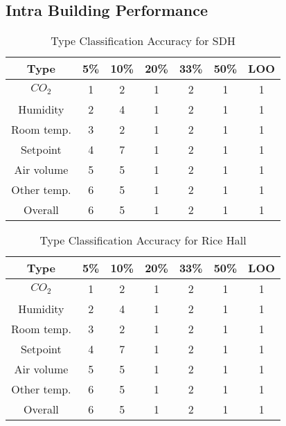 \subsection{Intra Building Performance}
\begin{table}[ht!]
\caption{Type Classification Accuracy for SDH}
\centering %
\begin{tabular}{c | c | c | c | c | c | c}%
\hline %
Type & 5\% & 10\% & 20\% & 33\% & 50\% & LOO \\ %
\hline\hline %
$CO_{2}$ & 1 & 2 & 1 & 2 & 1 & 1 \\ %
\hline %
Humidity & 2 & 4 & 1 & 2 & 1 & 1 \\
\hline %
Room temp. & 3 & 2 & 1 & 2 & 1 & 1 \\
\hline %
Setpoint & 4 & 7 & 1 & 2 & 1 & 1 \\
\hline %
Air volume & 5 & 5 & 1 & 2 & 1 & 1 \\ %
\hline %
Other temp. & 6 & 5 & 1 & 2 & 1 & 1 \\ %
\hline %
Overall & 6 & 5 & 1 & 2 & 1 & 1 \\ %
\hline %
\end{tabular}
\label{table:sdh} %
\end{table}

\begin{table}[ht!]
\caption{Type Classification Accuracy for Rice Hall}
\centering %
\begin{tabular}{c | c | c | c | c | c | c}%
\hline %
Type & 5\% & 10\% & 20\% & 33\% & 50\% & LOO \\ %
\hline\hline %
$CO_{2}$ & 1 & 2 & 1 & 2 & 1 & 1 \\ %
\hline %
Humidity & 2 & 4 & 1 & 2 & 1 & 1 \\
\hline %
Room temp. & 3 & 2 & 1 & 2 & 1 & 1 \\
\hline %
Setpoint & 4 & 7 & 1 & 2 & 1 & 1 \\
\hline %
Air volume & 5 & 5 & 1 & 2 & 1 & 1 \\ %
\hline %
Other temp. & 6 & 5 & 1 & 2 & 1 & 1 \\ %
\hline %
Overall & 6 & 5 & 1 & 2 & 1 & 1 \\ %
\hline %
\end{tabular}
\label{table:rice} %
\end{table}


